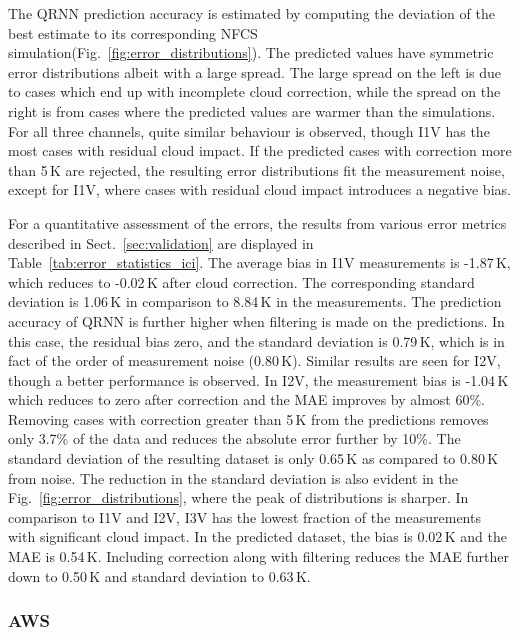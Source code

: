 \documentclass[amt, manuscript]{copernicus}
\begin{document}
The QRNN prediction accuracy is estimated by computing the deviation of the best estimate to its corresponding NFCS simulation(Fig.~\ref{fig:error_distributions}). The predicted values have symmetric error distributions albeit with a large spread. The large spread on the left is due to cases which end up with incomplete cloud correction, while the spread on the right is from cases where the predicted values are warmer than the simulations. For all three channels, quite similar behaviour is observed, though I1V has the most cases with residual cloud impact. If the predicted cases with correction more than 5\,K are rejected, the resulting error distributions fit the measurement noise, except for I1V, where cases with residual cloud impact introduces a negative bias. 

For a quantitative assessment of the errors, the results from various error metrics described in  Sect.~\ref{sec:validation} are displayed in Table~\ref{tab:error_statistics_ici}. The average bias in I1V measurements is -1.87\,K, which reduces to -0.02\,K after cloud correction. The corresponding standard deviation is 1.06\,K in comparison to 8.84\,K in the measurements. The prediction accuracy of QRNN is further higher when filtering is made on the predictions. In this case, the residual bias zero, and the standard deviation is 0.79\,K, which is in fact of the order of measurement noise (0.80\,K). Similar results are seen for I2V, though a better performance is observed. In I2V, the measurement bias is -1.04\,K which reduces to zero after correction and the MAE improves by almost 60\%. Removing cases with correction greater than 5\,K from the predictions removes only 3.7\% of the data and reduces the absolute error further by 10\%. The standard deviation of the resulting dataset is only 0.65\,K as compared to 0.80\,K from noise. The reduction in the standard deviation is also evident in the Fig.~\ref{fig:error_distributions}, where the peak of distributions is sharper. In comparison to I1V and I2V, I3V has the lowest fraction of the measurements with significant cloud impact. In the predicted dataset, the bias is 0.02\,K and the MAE is 0.54\,K. Including correction along with filtering reduces the MAE further down to 0.50\,K and standard deviation to 0.63\,K.  

\subsubsection{AWS}
\end{document}
